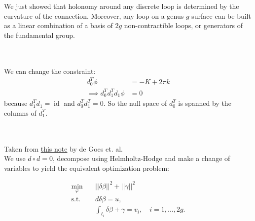 \documentclass{article}
\DeclareMathOperator{\id}{id}
\begin{document}
\vspace{1.8cm}
\\\\


We just showed that holonomy around any discrete loop is determined by the curvature of the connection.
Moreover, any loop on a genus $g$ surface can be built as a linear combination of a basis of $2g$ non-contractible loops,
or generators of the fundamental group.


\vspace{1.8cm}
\\\\


We can change the constraint:
\begin{align*}
    d_0^T \phi &= -K + 2\pi k \\
    \implies d_0^T d_1^T d_1 \phi &= 0
\end{align*}   
because $d_1^T d_1 = \id$ and $d_0^T d_1^T = 0$. So the null space of $d_0^T$ is spanned by the columns of $d_1^T$.


\vspace{1.8cm}
\\\\


Taken from \href{https://www.cs.cmu.edu/~kmcrane/Projects/TrivialConnections/simplyconnected.pdf}{this note}
by de Goes et. al. \\

We use $d \circ d = 0$, decompose using Helmholtz-Hodge and make a change of variables to yield the 
equivalent optimization problem:

\begin{align*}
    \min_{\varphi} \quad &||\delta \beta||^2 + ||\gamma||^2 \\
    \text{s.t.} \quad &d\delta \beta = u, \\
    &\int_{\ell_i} \delta\beta + \gamma = v_i, \quad i = 1, \dots ,2g.
\end{align*}
\end{document}
